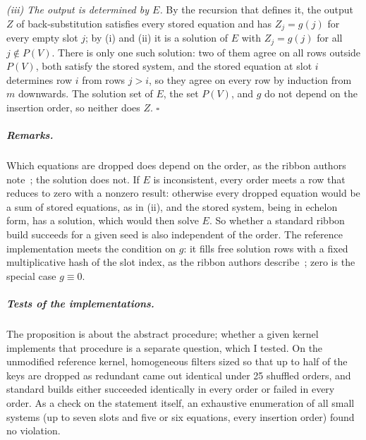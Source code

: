\documentclass[a4paper,UKenglish,cleveref,autoref,thm-restate,anonymous]{lipics-v2021}
\begin{document}
\emph{(iii) The output is determined by $E$.} By the recursion that defines it, the output $Z$ of
back-substitution satisfies every stored equation and has $Z_j=g(j)$ for every empty slot $j$; by
(i) and (ii) it is a solution of $E$ with $Z_j=g(j)$ for all $j\notin P(V)$. There is only one
such solution: two of them agree on all rows outside $P(V)$, both satisfy the stored system, and
the stored equation at slot $i$ determines row $i$ from rows $j>i$, so they agree on every row by
induction from $m$ downwards. The solution set of $E$, the set $P(V)$, and $g$ do not depend on
the insertion order, so neither does $Z$. \hfill$\square$

\subparagraph*{Remarks.} Which equations are dropped does depend on the order, as the ribbon authors
note~\cite{dietzfelbinger2026ribbon}; the solution does not. If $E$ is inconsistent, every order
meets a row that reduces to zero with a nonzero result: otherwise every dropped equation would be
a sum of stored equations, as in (ii), and the stored system, being in echelon form, has a
solution, which would then solve $E$. So whether a standard ribbon build succeeds for a given seed
is also independent of the order. The reference implementation meets the condition on $g$: it
fills free solution rows with a fixed multiplicative hash of the slot index, as the ribbon authors
describe~\cite{dietzfelbinger2026ribbon}; zero is the special case $g\equiv 0$.

\subparagraph*{Tests of the implementations.} The proposition is about the abstract procedure; whether a
given kernel implements that procedure is a separate question, which I tested. On the unmodified
reference kernel, homogeneous filters sized so that up to half of the keys are dropped as
redundant came out identical under 25 shuffled orders, and standard builds either succeeded
identically in every order or failed in every order. As a check on the statement itself, an
exhaustive enumeration of all small systems (up to seven slots and five or six equations, every
insertion order) found no violation.
\end{document}
